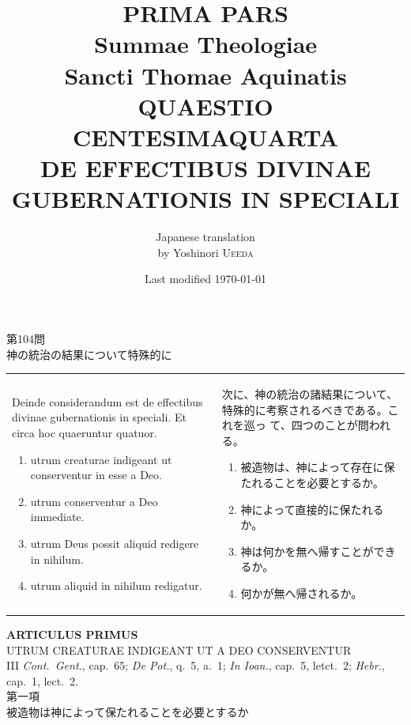 \documentclass[paper=a4paper,fontsize=10pt,jafontsize=9pt,titlepage]{jlreq}
\title{{\bfseries PRIMA PARS}\\{\Huge Summae Theologiae}\\Sancti Thomae
Aquinatis\\{\sffamily QUAESTIO CENTESIMAQUARTA}\\DE EFFECTIBUS DIVINAE
GUBERNATIONIS IN SPECIALI}
\author{Japanese translation\\by Yoshinori {\scshape Ueeda}}
\date{Last modified \today}
\begin{document}
\maketitle
\pagestyle{fancy}

\begin{center}
{\Large 第104問\\神の統治の結果について特殊的に}\\

\end{center}

\begin{longtable}{p{21em}p{21em}}

Deinde considerandum est de effectibus divinae
 gubernationis in speciali. Et circa hoc quaeruntur quatuor. 

\begin{enumerate}
 \item utrum creaturae indigeant ut conserventur in esse a Deo.
 \item utrum conserventur a Deo immediate.
 \item utrum Deus possit aliquid redigere in nihilum.
 \item utrum aliquid in nihilum redigatur.
\end{enumerate}


&

次に、神の統治の諸結果について、特殊的に考察されるべきである。これを巡っ
 て、四つのことが問われる。

\begin{enumerate}
 \item 被造物は、神によって存在に保たれることを必要とするか。
 \item 神によって直接的に保たれるか。
 \item 神は何かを無へ帰すことができるか。
 \item 何かが無へ帰されるか。
\end{enumerate}

\end{longtable}
\newpage
{}
\begin{center}
 {\Large {\bfseries ARTICULUS PRIMUS}}\\
 {\large UTRUM CREATURAE INDIGEANT UT A DEO CONSERVENTUR}\\
 {\footnotesize III {\itshape Cont.~Gent.}, cap.~65; {\itshape De Pot.},
 q.~5, a.~1; {\itshape In Ioan.}, cap.~5, letct.~2; {\itshape Hebr.},
 cap.~1, lect.~2.}\\
 {\Large 第一項\\被造物は神によって保たれることを必要とするか}
\end{center}
\end{document}
